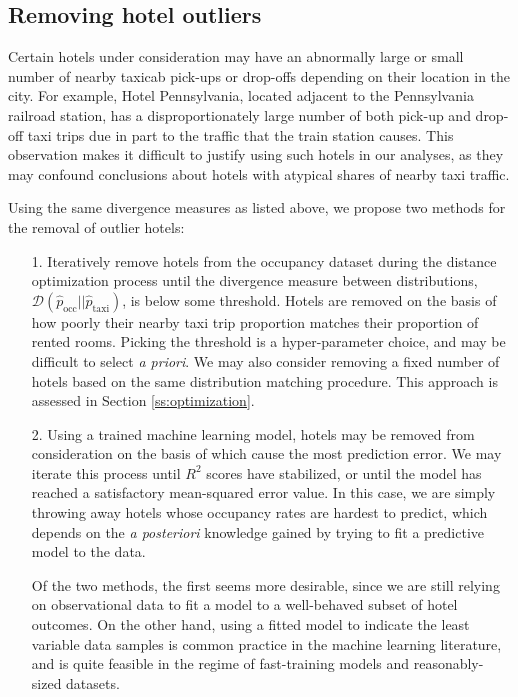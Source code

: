 \documentclass[useAMS, usenatbib]{biom}
\begin{document}
\subsection{Removing hotel outliers}
\label{ss:hotel_outliers}

Certain hotels under consideration may have an abnormally large or small number of nearby taxicab pick-ups or drop-offs depending on their location in the city. For example, Hotel Pennsylvania, located adjacent to the Pennsylvania railroad station, has a disproportionately large number of both pick-up and drop-off taxi trips due in part to the traffic that the train station causes. This observation makes it difficult to justify using such hotels in our analyses, as they may confound conclusions about hotels with atypical shares of nearby taxi traffic.

Using the same divergence measures as listed above, we propose two methods for the removal of outlier hotels:

\begin{itemize}

\item [1.] Iteratively remove hotels from the occupancy dataset during the distance optimization process until the divergence measure between distributions, $\mathcal{D} (\hat{p}_{\mathrm{occ}} || \hat{p}_{\mathrm{taxi}})$, is below some threshold. Hotels are removed on the basis of how poorly their nearby taxi trip proportion matches their proportion of rented rooms. Picking the threshold is a hyper-parameter choice, and may be difficult to select \textit{a priori}. We may also consider removing a fixed number of hotels based on the same distribution matching procedure. This approach is assessed in Section \ref{ss:optimization}.

\item [2.] Using a trained machine learning model, hotels may be removed from consideration on the basis of which cause the most prediction error. We may iterate this process until $R^2$ scores have stabilized, or until the model has reached a satisfactory mean-squared error value. In this case, we are simply throwing away hotels whose occupancy rates are hardest to predict, which depends on the \textit{a posteriori} knowledge gained by trying to fit a predictive model to the data.

Of the two methods, the first seems more desirable, since we are still relying on observational data to fit a model to a well-behaved subset of hotel outcomes. On the other hand, using a fitted model to indicate the least variable data samples is common practice in the machine learning literature, and is quite feasible in the regime of fast-training models and reasonably-sized datasets.

\end{itemize}
\end{document}

